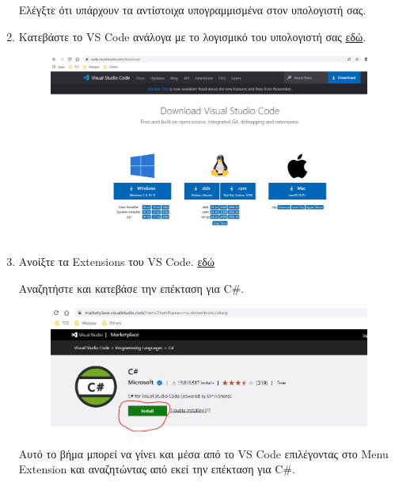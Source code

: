 \begin{enumerate}
    Ελέγξτε ότι υπάρχουν τα αντίστοιχα υπογραμμισμένα στον υπολογιστή σας.
    \\[10\baselineskip]
    
    \item Κατεβάστε το VS Code ανάλογα με το λογισμικό του υπολογιστή σας \href{https://code.visualstudio.com/Download}{\uline{εδώ}}.

    \begin{figure}[ht]
        \centering
        \includegraphics[scale=0.3]{images/instVSC3.jpeg}
    \end{figure}

    \item Ανοίξτε τα Extensions του VS Code. \href{https://marketplace.visualstudio.com/VSCode}{\uline{εδώ}}

    Αναζητήστε και κατεβάσε την επέκταση για C\#. 

    \begin{figure}[ht]
        \centering
        \includegraphics[scale=0.3]{images/instVSC4.jpeg}
    \end{figure}

    Αυτό το βήμα μπορεί να γίνει και μέσα από το VS Code επιλέγοντας στο Menu Extension και αναζητώντας από εκεί την επέκταση για C\#.


\end{enumerate}
